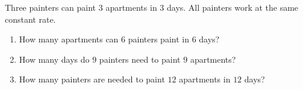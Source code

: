 Three painters can paint $3$ apartments in $3$ days. All painters work at the same constant rate.
\begin{enumerate}
\item[(a)] How many apartments can $6$ painters paint in $6$ days?
\item[(b)] How many days do $9$ painters need to paint $9$ apartments?
\item[(c)] How many painters are needed to paint $12$ apartments in $12$ days?
\end{enumerate}
